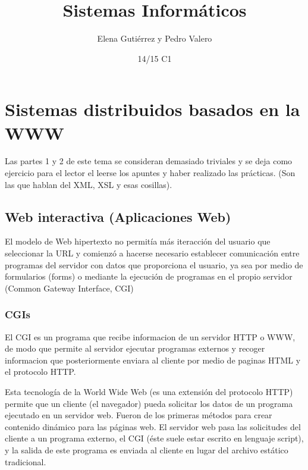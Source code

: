 \documentclass{apuntes}
\title{Sistemas Informáticos}
\author{Elena Gutiérrez y Pedro Valero}
\date{14/15 C1}
\begin{document}
\pagestyle{plain}
\maketitle

\tableofcontents
\newpage
\setcounter{chapter}{1}
\chapter{Sistemas distribuidos basados en la WWW}

Las partes 1 y 2 de este tema se consideran demasiado triviales y se deja como ejercicio para el lector el leerse los apuntes y haber realizado las prácticas. (Son las que hablan del XML, XSL y esas cosillas).

\setcounter{section}{2}
\section{Web interactiva (Aplicaciones Web)}
El modelo de Web hipertexto no permitía más iteracción del usuario que seleccionar la URL y comienzó a hacerse necesario establecer comunicación entre programas del servidor con datos que proporciona el usuario, ya sea por medio de formularios (forms) o mediante la ejecución de programas en el propio servidor (Common Gateway Interface, CGI)

\subsection{CGIs}
\begin{defn}[CGI]
El CGI es un programa que recibe informacion de un servidor HTTP o WWW, de modo que permite al servidor ejecutar programas externos y recoger informacion que posteriormente enviara al cliente por medio de paginas HTML y el protocolo HTTP. 
\end{defn}

Esta tecnología de la World Wide Web (es una extensión del protocolo HTTP) permite que un cliente (el navegador) pueda solicitar los datos de un programa ejecutado en un servidor web. Fueron de los primeras métodos para crear contenido dinámico para las páginas web. El servidor web pasa las solicitudes del cliente a un programa externo, el CGI  (éste suele estar escrito en lenguaje script), y la salida de este programa es enviada al cliente en lugar del archivo estático tradicional.
\end{document}
